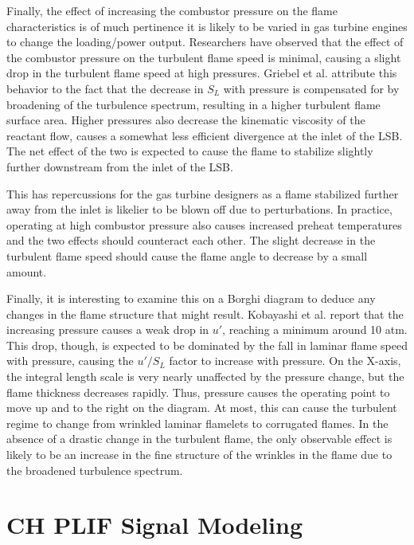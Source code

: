 Finally, the effect of increasing the combustor pressure on the flame characteristics is of much pertinence it is likely to be varied in gas turbine engines to change the loading/power output.
Researchers\cite{1998-kobayashi,2002-kobayashi-b} have observed that the effect of the combustor pressure on the turbulent flame speed is minimal, causing a slight drop in the turbulent flame speed at high pressures.
Griebel et al.\cite{2007-griebel} attribute this behavior to the fact that the decrease in \(S_L\) with pressure is compensated for by broadening of the turbulence spectrum, resulting in a higher turbulent flame surface area.
Higher pressures also decrease the kinematic viscosity of the reactant flow, causes a somewhat less efficient divergence at the inlet of the LSB.
The net effect of the two is expected to cause the flame to stabilize slightly further downstream from the inlet of the LSB.

This has repercussions for the gas turbine designers as a flame stabilized further away from the inlet is likelier to be blown off due to perturbations.
In practice, operating at high combustor pressure also causes increased preheat temperatures and the two effects should counteract each other.
The slight decrease in the turbulent flame speed should cause the flame angle to decrease by a small amount.

Finally, it is interesting to examine this on a Borghi diagram to deduce any changes in the flame structure that might result.
Kobayashi et al.\cite{1997-kobayashi} report that the increasing pressure causes a weak drop in \(u'\), reaching a minimum around 10 atm.
This drop, though, is expected to be dominated by the fall in laminar flame speed with pressure, causing the \(u'/S_L\) factor to increase with pressure.
On the X-axis, the integral length scale is very nearly unaffected by the pressure change, but the flame thickness decreases rapidly.
Thus, pressure causes the operating point to move up and to the right on the diagram.
At most, this can cause the turbulent regime to change from wrinkled laminar flamelets to corrugated flames.
In the absence of a drastic change in the turbulent flame, the only observable effect is likely to be an increase in the fine structure of the wrinkles in the flame due to the broadened turbulence spectrum.

\section{CH PLIF Signal Modeling}
\label{sec:background-chplif-signal-modeling}

